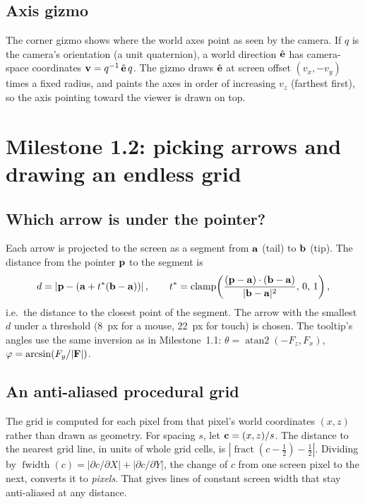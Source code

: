 \documentclass[11pt]{article}
\begin{document}
\subsection{Axis gizmo}
The corner gizmo shows where the world axes point as seen by the camera. If $q$ is the camera's
orientation (a unit quaternion), a world direction $\hat{\mathbf{e}}$ has camera-space coordinates
$\mathbf{v} = q^{-1}\,\hat{\mathbf{e}}\,q$. The gizmo draws $\hat{\mathbf{e}}$ at screen offset $(v_x, -v_y)$
times a fixed radius, and paints the axes in order of increasing $v_z$ (farthest first), so the
axis pointing toward the viewer is drawn on top.

\section{Milestone 1.2: picking arrows and drawing an endless grid}

\subsection{Which arrow is under the pointer?}
Each arrow is projected to the screen as a segment from $\mathbf{a}$ (tail) to $\mathbf{b}$ (tip). The
distance from the pointer $\mathbf{p}$ to the segment is
\begin{equation}
  d = \left|\mathbf{p} - (\mathbf{a} + t^\ast(\mathbf{b}-\mathbf{a}))\right|,\qquad
  t^\ast = \operatorname{clamp}\!\left(\frac{(\mathbf{p}-\mathbf{a})\cdot(\mathbf{b}-\mathbf{a})}{|\mathbf{b}-\mathbf{a}|^2},\,0,\,1\right),
\end{equation}
i.e.\ the distance to the closest point of the segment. The arrow with the smallest $d$ under a
threshold (\SI{8}{px} for a mouse, \SI{22}{px} for touch) is chosen. The tooltip's angles use the same
inversion as in Milestone~1.1: $\theta=\operatorname{atan2}(-F_z, F_x)$, $\varphi=\arcsin(F_y/|\mathbf{F}|)$.

\subsection{An anti-aliased procedural grid}
The grid is computed for each pixel from that pixel's world coordinates $(x,z)$ rather than drawn as
geometry. For spacing $s$, let $\mathbf{c} = (x,z)/s$. The distance to the nearest grid line, in
units of whole grid cells, is $|\operatorname{fract}(c-\tfrac12)-\tfrac12|$. Dividing by
$\operatorname{fwidth}(c) = |\partial c/\partial X| + |\partial c/\partial Y|$, the change of $c$
from one screen pixel to the next, converts it to \emph{pixels}. That gives lines of constant screen
width that stay anti-aliased at any distance.
\end{document}
